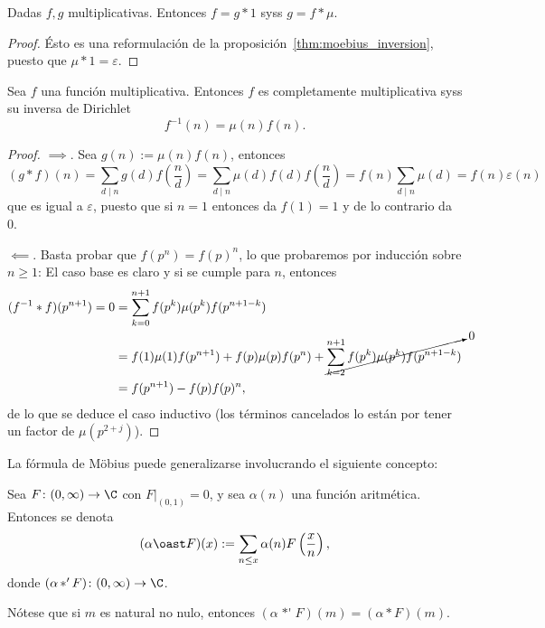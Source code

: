 \documentclass[teoria-numeros.tex]{subfiles}
\begin{document}

\begin{cor}
	Dadas $f, g$ multiplicativas.
	Entonces $f = g * 1$ syss $g = f * \mu$.
\end{cor}
\begin{proof}
	Ésto es una reformulación de la proposición~\ref{thm:moebius_inversion}, puesto que $\mu * 1 = \varepsilon$.
\end{proof}

\begin{thm}
	Sea $f$ una función multiplicativa.
	Entonces $f$ es completamente multiplicativa syss su inversa de Dirichlet
	$$ f^{-1}(n) = \mu(n)f(n). $$
\end{thm}
\begin{proof}
	$\implies$.
	Sea $g(n) := \mu(n)f(n)$, entonces
	$$ (g*f)(n) = \sum_{d \mid n} g(d)f\left( \frac{n}{d} \right) = \sum_{d \mid n} \mu(d)f(d)f\left( \frac{n}{d} \right) = f(n)\sum_{d\mid n}\mu(d)
	= f(n)\varepsilon(n) $$
	que es igual a $\varepsilon$, puesto que si $n = 1$ entonces da $f(1) = 1$ y de lo contrario da 0.

	$\impliedby$.
	Basta probar que $f(p^n) = f(p)^n$, lo que probaremos por inducción sobre $n\ge 1$:
	El caso base es claro y si se cumple para $n$, entonces
	\begin{align*}
		(f^{-1}*f)(p^{n+1}) = 0 &= \sum_{k=0}^{n+1} f(p^k)\mu(p^k)f(p^{n+1-k}) \\
		&= f(1)\mu(1)f(p^{n+1}) + f(p)\mu(p)f(p^n) + \cancelto{0}{ \sum_{k=2}^{n+1} f(p^k)\mu(p^k)f(p^{n+1-k}) } \\
		&= f(p^{n+1}) - f(p)f(p)^n,
	\end{align*}
	de lo que se deduce el caso inductivo (los términos cancelados lo están por tener un factor de $\mu(p^{2+j})$).
\end{proof}

La fórmula de Möbius puede generalizarse involucrando el siguiente concepto:
\begin{mydef}
	Sea $F\colon (0, \infty) \to \C$ con $F|_{(0, 1)} = 0$, y sea $\alpha(n)$ una función aritmética.
	Entonces se denota
	$$ (\alpha \oast F)(x) := \sum_{n\le x} \alpha(n)F\left( \frac{x}{n} \right), $$
	donde $(\alpha \mathop{*'} F) \colon (0, \infty) \to \C$.
\end{mydef}
Nótese que si $m$ es natural no nulo, entonces $(\alpha \mathop{*'} F)(m) = (\alpha * F)(m)$.
\end{document}
